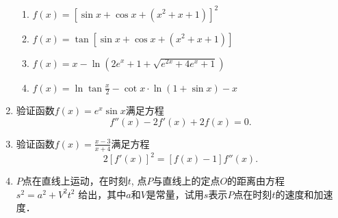 \begin{enumerate}
\begin{enumerate}
		\item $f(x)=\left[\sin x+\cos x+\left(x^{2}+x+1\right)\right]^{2}$
		\item $f(x)=\tan\left[\sin x+\cos x+\left(x^{2}+x+1\right)\right]$
		\item  $f(x)=x-\ln \left(2 e^{x}+1+\sqrt{e^{2 x}+4 e^{x}+1}\right)$
		\item  $f(x)=\ln \tan  \frac{x}{2}-\cot x \cdot \ln (1+\sin x)-x$
	\end{enumerate}

\item 验证函数$f(x)=e^x \sin x$满足方程
\[f'' (x) -2f' (x) +2f (x) =0.\]

\item 验证函数$f(x)=\frac{x-3}{x+4}$满足方程
\[2 [f' (x) ]^2= [f (x) -1] f'' (x).\]

\item $P$点在直线上运动，在时刻$t$, 点$P$与直线上的定点$O$的距离由方程
$s^2=a^2+V^2t^2$
给出，其中$a$和$V$是常量，试用$s$表示$P$点在时刻$t$的速度和加速度．


\end{enumerate}
